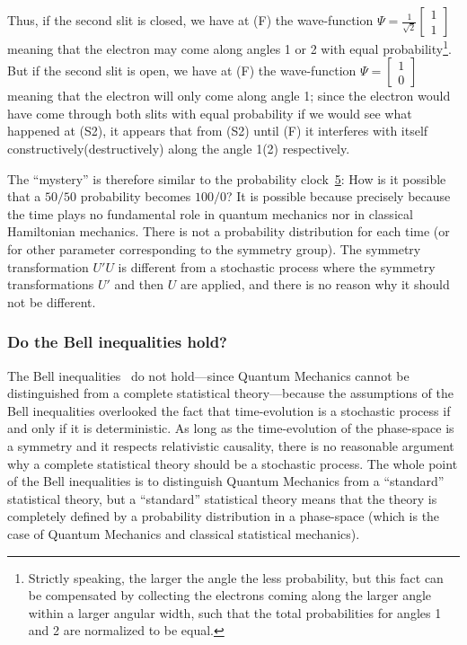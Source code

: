 \documentclass[11pt]{book}
\begin{document}
Thus, if the second slit is closed, we have at (F) the wave-function
\(\Psi=\frac{1}{\sqrt{2}}\left[\begin{smallmatrix} 1 \\ 1 \end{smallmatrix}\right]\)
meaning that the electron may come along angles 1 or 2 with equal
probability\footnote{Strictly speaking, the larger the angle the less
  probability, but this fact can be compensated by collecting the
  electrons coming along the larger angle within a larger angular width,
  such that the total probabilities for angles 1 and 2 are normalized to
  be equal.}. But if the second slit is open, we have at (F) the
wave-function
\(\Psi=\left[\begin{smallmatrix} 1 \\ 0\end{smallmatrix}\right]\)
meaning that the electron will only come along angle 1; since the
electron would have come through both slits with equal probability if we
would see what happened at (S2), it appears that from (S2) until (F) it
interferes with itself constructively(destructively) along the angle
1(2) respectively.

The ``mystery'' is therefore similar to the probability
clock~\protect\hyperlink{sec:euler}{5}: How is it possible that a
\(50/50\) probability becomes \(100/0\)? It is possible because
precisely because the time plays no fundamental role in quantum
mechanics nor in classical Hamiltonian mechanics. There is not a
probability distribution for each time (or for other parameter
corresponding to the symmetry group). The symmetry transformation
\(U'U\) is different from a stochastic process where the symmetry
transformations \(U'\) and then \(U\) are applied, and there is no
reason why it should not be different.

\hypertarget{do-the-bell-inequalities-hold}{%
\subsubsection{Do the Bell inequalities
hold?}\label{do-the-bell-inequalities-hold}}

The Bell inequalities~\cite{Bell1964On}
do not hold---since Quantum Mechanics cannot be distinguished from a
complete statistical theory---because the assumptions of the Bell
inequalities overlooked the fact that time-evolution is a stochastic
process if and only if it is deterministic. As long as the
time-evolution of the phase-space is a symmetry and it respects
relativistic causality, there is no reasonable argument why a complete
statistical theory should be a stochastic process. The whole point of
the Bell inequalities is to distinguish Quantum Mechanics from a
``standard'' statistical theory, but a ``standard'' statistical theory
means that the theory is completely defined by a probability
distribution in a phase-space (which is the case of Quantum Mechanics
and classical statistical mechanics).
\end{document}
